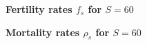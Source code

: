 \documentclass[letterpaper,12pt]{article}
\theoremstyle{definition}
\begin{document}
  \begin{figure}[htbp]\centering \captionsetup{width=4.0in}
    \caption{\label{FigFertRates}\textbf{Fertility rates $f_s$ for $S=60$}}
  \end{figure}

  \begin{figure}[htbp]\centering \captionsetup{width=4.0in}
    \caption{\label{FigMortRates}\textbf{Mortality rates $\rho_s$ for $S=60$}}
  \end{figure}
\end{document}
